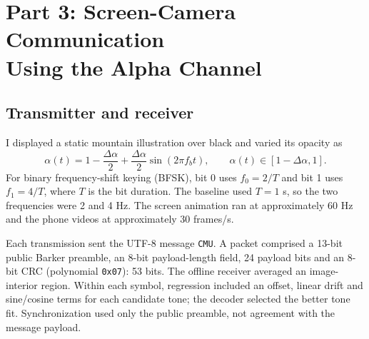 \documentclass[10pt,a4paper,twoside]{article}
\begin{document}
\clearpage
\section[Part 3: Screen-Camera Communication Using Alpha]{Part 3: Screen-Camera Communication\\Using the Alpha Channel}
\subsection{Transmitter and receiver}
I displayed a static mountain illustration over black and varied its opacity as
\[
\alpha(t)=1-\frac{\Delta\alpha}{2}+\frac{\Delta\alpha}{2}\sin(2\pi f_b t),
\qquad \alpha(t)\in[1-\Delta\alpha,1].
\]
For binary frequency-shift keying (BFSK), bit 0 uses $f_0=2/T$ and bit 1 uses $f_1=4/T$, where $T$ is the bit duration. The baseline used $T=1$ s, so the two frequencies were 2 and 4 Hz. The screen animation ran at approximately 60 Hz and the phone videos at approximately 30 frames/s.

Each transmission sent the UTF-8 message \texttt{CMU}. A packet comprised a 13-bit public Barker preamble, an 8-bit payload-length field, 24 payload bits and an 8-bit CRC (polynomial \texttt{0x07}): 53 bits. The offline receiver averaged an image-interior region. Within each symbol, regression included an offset, linear drift and sine/cosine terms for each candidate tone; the decoder selected the better tone fit. Synchronization used only the public preamble, not agreement with the message payload.
\end{document}
